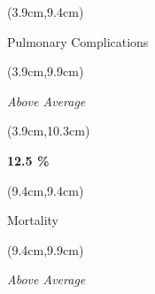 \documentclass[
  11pt,
  landscape]{article}
\begin{document}

\begin{textblock*}{5cm}(3.9cm,9.4cm) %
    \centerline{\small{Pulmonary Complications}}
\end{textblock*}

\begin{textblock*}{5cm}(3.9cm,9.9cm) %
    \small \centerline{\textit{Above Average}}
\end{textblock*}

\begin{textblock*}{5cm}(3.9cm,10.3cm) %
    \centerline{\textbf{12.5 \%}}
\end{textblock*}

\begin{textblock*}{5cm}(9.4cm,9.4cm) %
    \centerline{\small{Mortality }}
\end{textblock*}

\begin{textblock*}{5cm}(9.4cm,9.9cm) %
    \small \centerline{\textit{Above Average}}
\end{textblock*}
\end{document}
